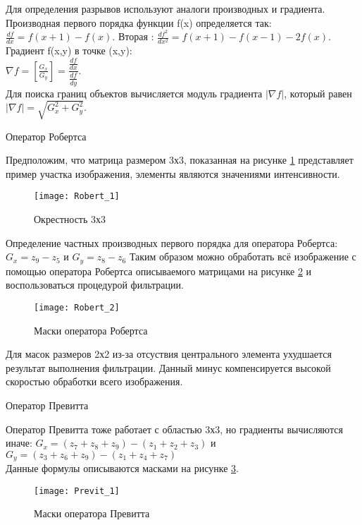 Для определения разрывов используют аналоги производных и градиента.
Производная первого порядка  функции f(x) определяется так:  $\frac{df}{dx} = f(x + 1) - f(x)$.
Вторая :
$\frac{df^2}{dx^2} = f(x + 1) - f(x - 1) - 2f(x)$.\\
Градиент f(x,y) в точке (x,y):\\
$\nabla f = [\frac{G_x}{G_y}] = \dfrac{\frac{df}{dx}}{\frac{df}{dy}}$.\\

Для поиска границ объектов вычисляется модуль градиента $ |\nabla f| $, который равен\\
$|\nabla f| = \sqrt{G_x^2 + G_y^2}$.
{\begin{center}
		Оператор Робертса
\end{center}}
Предположим, что матрица размером 3х3, показанная на рисунке \ref{Robert_1} представляет пример участка изображения, элементы являются значениями интенсивности.\cite{Phdthesis}


\begin{figure}[H]
	\centering
	\texttt{[image: Robert\_1]}
	\caption{Окрестность 3х3}
	\label{Robert_1}
\end{figure}  

Определение частных производных первого порядка для оператора Робертса:  $G_x = z_9 - z_5$ и $G_y = z_8 - z_6$
Таким образом можно обработать всё изображение с помощью оператора Робертса
описываемого матрицами на рисунке \ref{Robert_2} и воспользоваться процедурой фильтрации.\cite{Phdthesis}

\begin{figure}[H]
	\centering
	\texttt{[image: Robert\_2]}
	\caption{Маски оператора Робертса}
	\label{Robert_2}
\end{figure}

Для масок размеров 2х2 из-за отсуствия центрального элемента ухудшается результат выполнения фильтрации. Данный минус компенсируется высокой скоростью обработки всего изображения.

{\begin{center}
		Оператор Превитта
\end{center}}

Оператор Превитта тоже работает с областью 3х3, но градиенты вычисляются иначе:
$G_x = (z_7 + z_8 + z_9) - (z_1 + z_2 + z_3)$ и $G_y = (z_3 + z_6 + z_9) - (z_1 + z_4 + z_7)$\\
Данные формулы описываются масками на рисунке \ref{Previt_1}.  
\begin{figure}[H]
	\centering
	\texttt{[image: Previt\_1]}
	\caption{Маски оператора Превитта}
	\label{Previt_1}
\end{figure}


